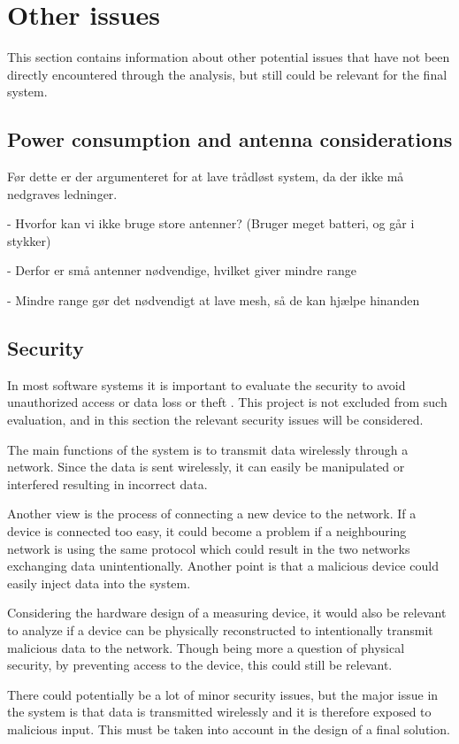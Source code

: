 \section{Other issues}
This section contains information about other potential issues that have not been directly encountered through the analysis, but still could be relevant for the final system.

\subsection{Power consumption and antenna considerations}
Før dette er der argumenteret for at lave trådløst system, da der ikke må nedgraves ledninger.

- Hvorfor kan vi ikke bruge store antenner? (Bruger meget batteri, og går i stykker)

- Derfor er små antenner nødvendige, hvilket giver mindre range

- Mindre range gør det nødvendigt at lave mesh, så de kan hjælpe hinanden

\subsection{Security}
In most software systems it is important to evaluate the security to avoid unauthorized access or data loss or theft . This project is not excluded from such evaluation, and in this section the relevant security issues will be considered.

The main functions of the system is to transmit data wirelessly through a network. Since the data is sent wirelessly, it can easily be manipulated or interfered resulting in incorrect data.

Another view is the process of connecting a new device to the network. If a device is connected too easy, it could become a problem if a neighbouring network is using the same protocol which could result in the two networks exchanging data unintentionally. Another point is that a malicious device could easily inject data into the system.

Considering the hardware design of a measuring device, it would also be relevant to analyze if a device can be physically reconstructed to intentionally transmit malicious data to the network. Though being more a question of physical security, by preventing access to the device, this could still be relevant.

There could potentially be a lot of minor security issues, but the major issue in the system is that data is transmitted wirelessly and it is therefore exposed to malicious input. This must be taken into account in the design of a final solution.


